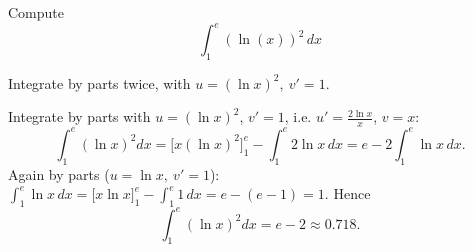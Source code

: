 
\begin{question}
Compute
\[ \int_1^e(\ln(x))^2\,dx \]
\end{question}

\begin{hint}
Integrate by parts twice, with $u=(\ln x)^2,\ v'=1$.
\end{hint}

\begin{solution}
Integrate by parts with $u=(\ln x)^2$, $v'=1$, i.e. $u'=\frac{2\ln x}{x}$, $v=x$:
\[ \int_1^e(\ln x)^2dx=\Big[x(\ln x)^2\Big]_1^e-\int_1^e 2\ln x\,dx=e-2\int_1^e\ln x\,dx. \]
Again by parts ($u=\ln x,\ v'=1$): $\int_1^e\ln x\,dx=\big[x\ln x\big]_1^e-\int_1^e1\,dx=e-(e-1)=1$. Hence
\[ \int_1^e(\ln x)^2dx=\boxed{e-2}\approx0.718. \]
\end{solution}
